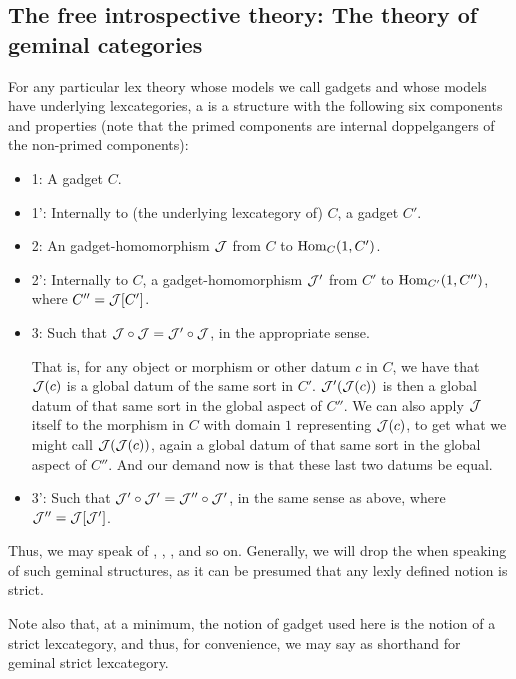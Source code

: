 \subsection{The free introspective theory: The theory of geminal categories}
\begin{definition}
For any particular lex theory whose models we call gadgets and whose models have underlying lexcategories, a  is a structure with the following six components and properties (note that the primed components are internal doppelgangers of the non-primed components):
\begin{itemize}
    \item 1: A gadget $C$.
    \item 1': Internally to (the underlying lexcategory of) $C$, a gadget $C'$.
    \item 2: An gadget-homomorphism $\mathcal{J}$ from $C$ to $\operatorname{Hom}_C(1, C')$.
    \item 2': Internally to $C$, a gadget-homomorphism $\mathcal{J}'$ from $C'$ to $\operatorname{Hom}_{C'}(1, C'')$, where $C'' = \mathcal{J}[C']$.
    \item 3: Such that $\mathcal{J} \circ \mathcal{J} = \mathcal{J}' \circ \mathcal{J}$, in the appropriate sense.
    
    That is, for any object or morphism or other datum $c$ in $C$, we have that $\mathcal{J}(c)$ is a global datum of the same sort in $C'$. $\mathcal{J}' (\mathcal{J}(c))$ is then a global datum of that same sort in the global aspect of $C''$. We can also apply $\mathcal{J}$ itself to the morphism in $C$ with domain $1$ representing $\mathcal{J}(c)$, to get what we might call $\mathcal{J} (\mathcal{J}(c))$, again a global datum of that same sort in the global aspect of $C''$. And our demand now is that these last two datums be equal.
    
    \item 3': Such that $\mathcal{J}' \circ \mathcal{J}' = \mathcal{J}'' \circ \mathcal{J}'$, in the same sense as above, where $\mathcal{J}'' = \mathcal{J}[\mathcal{J}']$.
\end{itemize}
Thus, we may speak of , , , and so on. Generally, we will drop the  when speaking of such geminal structures, as it can be presumed that any lexly defined notion is strict.

Note also that, at a minimum, the notion of gadget used here is the notion of a strict lexcategory, and thus, for convenience, we may say  as shorthand for geminal strict lexcategory.


\end{definition}

